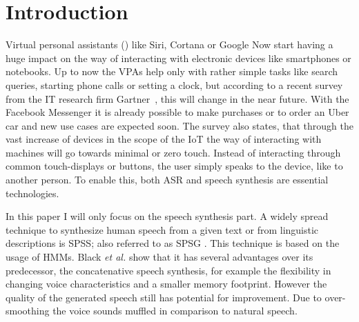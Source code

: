 

\section{Introduction}
\label{sec:introduction}

Virtual personal assistants () like Siri, Cortana or Google Now start having a huge impact on the way of interacting with electronic devices like smartphones or notebooks. Up to now the \acp{VPA} help only with rather simple tasks like search queries, starting phone calls or setting a clock, but according to a recent survey from the IT research firm Gartner~\cite{gartner:assistants}, this will change in the near future. With the Facebook Messenger it is already possible to make purchases or to order an Uber car and new use cases are expected soon. The survey also states, that through the vast increase of devices in the scope of the \ac{IoT} the way of interacting with machines will go towards minimal or zero touch. Instead of interacting through common touch-displays or buttons, the user simply speaks to the device, like to another person. To enable this, both \ac{ASR} and speech synthesis are essential technologies.

In this paper I will only focus on the speech synthesis part. A widely spread technique to synthesize human speech from a given text or from linguistic descriptions is \ac{SPSS}; also referred to as \ac{SPSG} \cite{ling:deep}. This technique is based on the usage of \acp{HMM}. Black \textit{et al.} \cite{black:statistical} show that it has several advantages over its predecessor, the concatenative speech synthesis, for example the flexibility in changing voice characteristics and a smaller memory footprint. However the quality of the generated speech still has potential for improvement. Due to over-smoothing the voice sounds muffled in comparison to natural speech.

